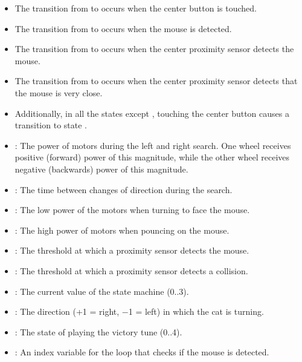 \begin{itemize}

\item The transition from  to  occurs when
the center button is touched.

\item The transition from  to  occurs
when the mouse is detected.

\item The transition from  to  occurs
when the center proximity sensor detects the mouse.

\item The transition from  to  occurs
when the center proximity sensor detects that the mouse is very close.

\item Additionally, in all the states except , touching the
center button causes a transition to state .
\end{itemize}


\begin{itemize}

\item {}: The power of motors during the left and right search.
One wheel receives positive (forward) power of this magnitude, while the
other wheel receives negative (backwards) power of this magnitude.

\item {}: The time between changes of direction during the search.
\item {}: The low power of the motors when turning to face the mouse.
\item {}: The high power of motors when pouncing on the mouse.
\item {}: The threshold at which a proximity sensor detects the mouse.
\item {}: The threshold at which a proximity sensor detects a collision.
\end{itemize}


\begin{itemize}
\item {}: The current value of the state machine (0..3). 
\item {}: The direction (+1 = right, $-$1 = left) in which the cat is turning.
\item {}: The state of playing the victory tune (0..4).
\item {}: An index variable for the loop that checks if the mouse is detected.

\end{itemize}

